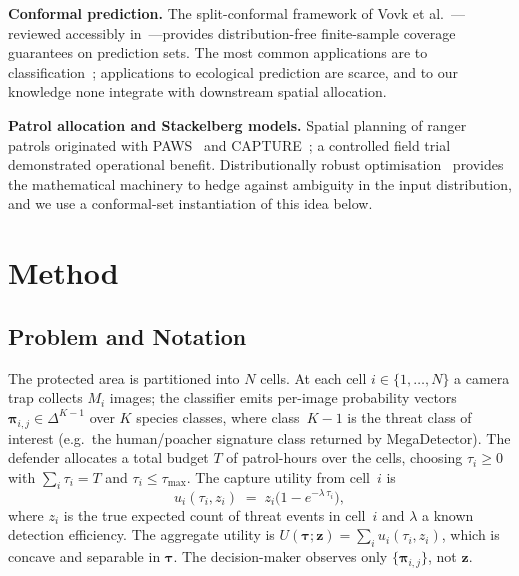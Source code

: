 \documentclass[conference]{IEEEtran}
\begin{document}
\textbf{Conformal prediction.} The split-conformal framework of
Vovk et al.~\cite{vovk2005algorithmic}---reviewed accessibly
in~\cite{angelopoulos2023conformal}---provides distribution-free
finite-sample coverage guarantees on prediction sets. The most common
applications are to classification~\cite{romano2020classification};
applications to ecological prediction are scarce, and to our knowledge
none integrate with downstream spatial allocation.

\textbf{Patrol allocation and Stackelberg models.} Spatial planning of
ranger patrols originated with PAWS~\cite{fang2016paws} and
CAPTURE~\cite{nguyen2016capture}; a controlled field
trial~\cite{gholami2017taking} demonstrated operational benefit.
Distributionally robust optimisation~\cite{esfahani2018wasserstein}
provides the mathematical machinery to hedge against ambiguity in the
input distribution, and we use a conformal-set instantiation of this
idea below.

\section{Method}

\subsection{Problem and Notation}

The protected area is partitioned into $N$ cells. At each cell $i\in
\{1,\dots,N\}$ a camera trap collects $M_i$ images; the classifier
emits per-image probability vectors
$\boldsymbol{\pi}_{i,j}\in\Delta^{K-1}$ over $K$ species classes,
where class~$K{-}1$ is the threat class of interest (e.g.\ the
human/poacher signature class returned by MegaDetector). The
defender allocates a total budget $T$ of patrol-hours over the cells,
choosing $\tau_i\ge0$ with $\sum_i\tau_i=T$ and $\tau_i\le\tau_{\max}$.
The capture utility from cell~$i$ is
\begin{equation}
  u_i(\tau_i,z_i) \;=\; z_i\bigl(1-e^{-\lambda\,\tau_i}\bigr),
  \label{eq:cell_utility}
\end{equation}
where $z_i$ is the true expected count of threat events in cell~$i$
and $\lambda$ a known detection efficiency. The aggregate utility is
$U(\boldsymbol{\tau};\mathbf{z})=\sum_i u_i(\tau_i,z_i)$, which is
concave and separable in $\boldsymbol{\tau}$. The decision-maker
observes only $\{\boldsymbol{\pi}_{i,j}\}$, not $\mathbf{z}$.
\end{document}

